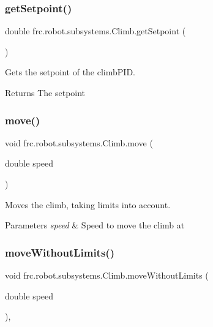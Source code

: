\subsubsection{\texorpdfstring{getSetpoint()}{getSetpoint()}}
{\footnotesize\ttfamily double frc.\+robot.\+subsystems.\+Climb.\+get\+Setpoint (\begin{DoxyParamCaption}{ }\end{DoxyParamCaption})\hspace{0.3cm}{\ttfamily [inline]}}



Gets the setpoint of the climb\+P\+ID. 

\begin{DoxyReturn}{Returns}
The setpoint 
\end{DoxyReturn}
\mbox{\label{classfrc_1_1robot_1_1subsystems_1_1_climb_a31e9316a6edd4b95b386d94edc3c418b}} 
\subsubsection{\texorpdfstring{move()}{move()}}
{\footnotesize\ttfamily void frc.\+robot.\+subsystems.\+Climb.\+move (\begin{DoxyParamCaption}\item[{double}]{speed }\end{DoxyParamCaption})\hspace{0.3cm}{\ttfamily [inline]}}



Moves the climb, taking limits into account. 


\begin{DoxyParams}{Parameters}
{\em speed} & Speed to move the climb at \\
\hline
\end{DoxyParams}
\mbox{\label{classfrc_1_1robot_1_1subsystems_1_1_climb_a2e78533d2e31c4e8cb3e08eb751d3d6f}} 
\subsubsection{\texorpdfstring{moveWithoutLimits()}{moveWithoutLimits()}}
{\footnotesize\ttfamily void frc.\+robot.\+subsystems.\+Climb.\+move\+Without\+Limits (\begin{DoxyParamCaption}\item[{double}]{speed }\end{DoxyParamCaption})\hspace{0.3cm}{\ttfamily [inline]}, {\ttfamily [private]}}



